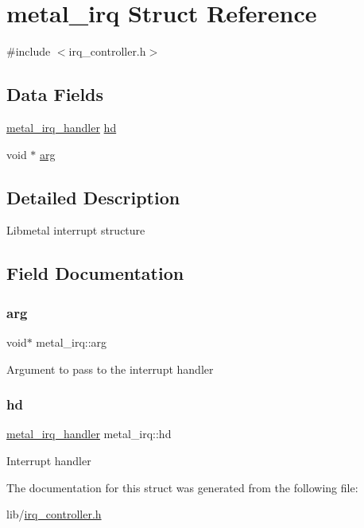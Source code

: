 \hypertarget{structmetal__irq}{}\section{metal\+\_\+irq Struct Reference}
\label{structmetal__irq}


{\ttfamily \#include $<$irq\+\_\+controller.\+h$>$}

\subsection*{Data Fields}
\begin{DoxyCompactItemize}
\item 
\hyperlink{group__irq_ga4fd6caa764267fc62373ae22e17aea2a}{metal\+\_\+irq\+\_\+handler} \hyperlink{structmetal__irq_a8969714de2c7866c68fd8d9bee088618}{hd}
\item 
void $\ast$ \hyperlink{structmetal__irq_a25553b16650573b5da6cebae9fe09886}{arg}
\end{DoxyCompactItemize}


\subsection{Detailed Description}
Libmetal interrupt structure 

\subsection{Field Documentation}
\mbox{\label{structmetal__irq_a25553b16650573b5da6cebae9fe09886}} 
\subsubsection{\texorpdfstring{arg}{arg}}
{\footnotesize\ttfamily void$\ast$ metal\+\_\+irq\+::arg}

Argument to pass to the interrupt handler \mbox{\label{structmetal__irq_a8969714de2c7866c68fd8d9bee088618}} 
\subsubsection{\texorpdfstring{hd}{hd}}
{\footnotesize\ttfamily \hyperlink{group__irq_ga4fd6caa764267fc62373ae22e17aea2a}{metal\+\_\+irq\+\_\+handler} metal\+\_\+irq\+::hd}

Interrupt handler 

The documentation for this struct was generated from the following file\+:\begin{DoxyCompactItemize}
\item 
lib/\hyperlink{irq__controller_8h}{irq\+\_\+controller.\+h}\end{DoxyCompactItemize}
